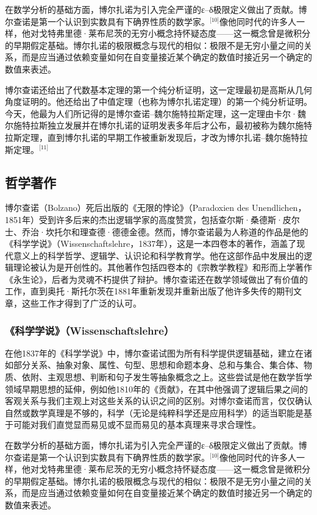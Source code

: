 在数学分析的基础方面，博尔扎诺为引入完全严谨的ε–δ极限定义做出了贡献。博尔查诺是第一个认识到实数具有下确界性质的数学家。\(^\text{[10]}\)像他同时代的许多人一样，他对戈特弗里德·莱布尼茨的无穷小概念持怀疑态度——这一概念曾是微积分的早期假定基础。博尔扎诺的极限概念与现代的相似：极限不是无穷小量之间的关系，而是应当通过依赖变量如何在自变量接近某个确定的数值时接近另一个确定的数值来表述。

博尔查诺还给出了代数基本定理的第一个纯分析证明，这一定理最初是高斯从几何角度证明的。他还给出了中值定理（也称为博尔扎诺定理）的第一个纯分析证明。今天，他最为人们所记得的是博尔查诺–魏尔施特拉斯定理，这一定理由卡尔·魏尔施特拉斯独立发展并在博尔扎诺的证明发表多年后才公布，最初被称为魏尔施特拉斯定理，直到博尔扎诺的早期工作被重新发现后，才改为博尔扎诺–魏尔施特拉斯定理。\(^\text{[11]}\)
\subsection{哲学著作}  
博尔查诺（Bolzano）死后出版的《无限的悖论》（Paradoxien des Unendlichen，1851年）受到许多后来的杰出逻辑学家的高度赞赏，包括查尔斯·桑德斯·皮尔士、乔治·坎托尔和理查德·德德金德。然而，博尔查诺最为人称道的作品是他的《科学学说》（Wissenschaftslehre，1837年），这是一本四卷本的著作，涵盖了现代意义上的科学哲学、逻辑学、认识论和科学教育学。他在这部作品中发展出的逻辑理论被认为是开创性的。其他著作包括四卷本的《宗教学教程》和形而上学著作《永生论》，后者为灵魂不朽提供了辩护。博尔查诺还在数学领域做出了有价值的工作，直到奥托·斯托尔茨在1881年重新发现并重新出版了他许多失传的期刊文章，这些工作才得到了广泛的认可。
\subsubsection{《科学学说》（Wissenschaftslehre）}  
在他1837年的《科学学说》中，博尔查诺试图为所有科学提供逻辑基础，建立在诸如部分关系、抽象对象、属性、句型、思想和命题本身、总和与集合、集合体、物质、依附、主观思想、判断和句子发生等抽象概念之上。这些尝试是他在数学哲学领域早期思想的延伸，例如他1810年的《贡献》，在其中他强调了逻辑后果之间的客观关系与我们主观上对这些关系的认识之间的区别。对博尔查诺而言，仅仅确认自然或数学真理是不够的，科学（无论是纯粹科学还是应用科学）的适当职能是基于可能对我们直觉显而易见或不显而易见的基本真理来寻求合理性。

在数学分析的基础方面，博尔扎诺为引入完全严谨的ε–δ极限定义做出了贡献。博尔查诺是第一个认识到实数具有下确界性质的数学家。\(^\text{[10]}\)像他同时代的许多人一样，他对戈特弗里德·莱布尼茨的无穷小概念持怀疑态度——这一概念曾是微积分的早期假定基础。博尔扎诺的极限概念与现代的相似：极限不是无穷小量之间的关系，而是应当通过依赖变量如何在自变量接近某个确定的数值时接近另一个确定的数值来表述。

